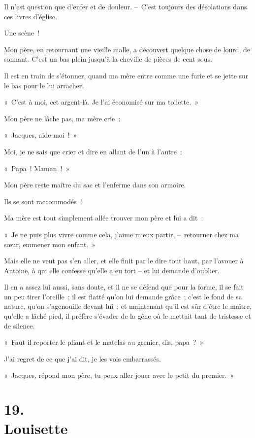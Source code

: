 \documentclass[french,twoside]{book} %
\begin{document}
Il n’est question que d’enfer et de douleur. – C’est toujours des désolations dans ces livres d’église.\par
\bigbreak
\noindent Une scène !\par
Mon père, en retournant une vieille malle, a découvert quelque chose de lourd, de sonnant. C’est un bas plein jusqu’à la cheville de pièces de cent sous.\par
Il est en train de s’étonner, quand ma mère entre comme une furie et se jette sur le bas pour le lui arracher.\par
« C’est à moi, cet argent-là. Je l’ai économisé sur ma toilette. »\par
Mon père ne lâche pas, ma mère crie :\par
« Jacques, aide-moi ! »\par
Moi, je ne sais que crier et dire en allant de l’un à l’autre :\par
« Papa ! Maman ! »\par
Mon père reste maître du sac et l’enferme dans son armoire.\par
\bigbreak
\noindent Ils se sont raccommodés !\par
Ma mère est tout simplement allée trouver mon père et lui a dit :\par
« Je ne puis plus vivre comme cela, j’aime mieux partir, – retourner chez ma sœur, emmener mon enfant. »\par
\bigbreak
\noindent Mais elle ne veut pas s’en aller, et elle finit par le dire tout haut, par l’avouer à Antoine, à qui elle confesse qu’elle a eu tort – et lui demande d’oublier.\par
Il en a assez lui aussi, sans doute, et il ne se défend que pour la forme, il se fait un peu tirer l’oreille ; il est flatté qu’on lui demande grâce ; c’est le fond de sa nature, qu’on s’agenouille devant lui ; et maintenant qu’il est sûr d’être le maître, qu’elle a lâché pied, il préfère s’évader de la gêne où le mettait tant de tristesse et de silence.\par
« Faut-il reporter le pliant et le matelas au grenier, dis, papa ? »\par
J’ai regret de ce que j’ai dit, je les vois embarrassés.\par
« Jacques, répond mon père, tu peux aller jouer avec le petit du premier. »
\section[{19. Louisette}]{19. \\
Louisette}\renewcommand{\leftmark}{19. \\
Louisette}
\end{document}
